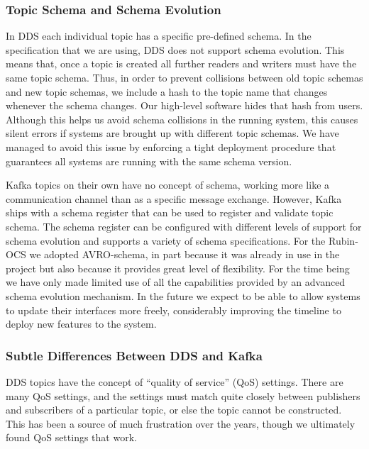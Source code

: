 \documentclass[]{spie}  %
\begin{document}
\subsubsection{Topic Schema and Schema Evolution}
\label{subsubsec:schema_evolution}

In DDS each individual topic has a specific pre-defined schema.
In the specification that we are using, DDS does not support schema evolution.
This means that, once a topic is created all further readers and writers must have the same topic schema.
Thus, in order to prevent collisions between old topic schemas and new topic schemas, we include a hash to the topic name that changes whenever the schema changes.
Our high-level software hides that hash from users.
Although this helps us avoid schema collisions in the running system, this causes silent errors if systems are brought up with different topic schemas.
We have managed to avoid this issue by enforcing a tight deployment procedure that guarantees all systems are running with the same schema version.

Kafka topics on their own have no concept of schema, working more like a communication channel than as a specific message exchange.
However, Kafka ships with a schema register that can be used to register and validate topic schema.
The schema register can be configured with different levels of support for schema evolution and supports a variety of schema specifications.
For the Rubin-OCS we adopted AVRO-schema, in part because it was already in use in the project but also because it provides great level of flexibility.
For the time being we have only made limited use of all the capabilities provided by an advanced schema evolution mechanism.
In the future we expect to be able to allow systems to update their interfaces more freely, considerably improving the timeline to deploy new features to the system.

\subsubsection{Subtle Differences Between DDS and Kafka}
\label{subsubsec:subtle_differences}

DDS topics have the concept of “quality of service” (QoS) settings.
There are many QoS settings, and the settings must match quite closely between publishers and subscribers of a particular topic, or else the topic cannot be constructed.
This has been a source of much frustration over the years, though we ultimately found QoS settings that work.
\end{document}
